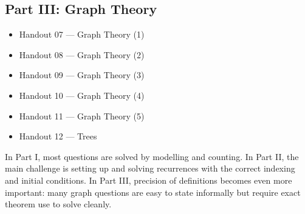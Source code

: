 \documentclass[12pt]{article}
\begin{document}
\subsection*{Part III: Graph Theory}
\begin{itemize}[leftmargin=*]
    \item Handout 07 --- Graph Theory (1)
    \item Handout 08 --- Graph Theory (2)
    \item Handout 09 --- Graph Theory (3)
    \item Handout 10 --- Graph Theory (4)
    \item Handout 11 --- Graph Theory (5)
    \item Handout 12 --- Trees
\end{itemize}

\begin{examtip}[title={What changes across the three parts}]
In Part I, most questions are solved by modelling and counting. In Part II, the main challenge is setting up and solving recurrences with the correct indexing and initial conditions. In Part III, precision of definitions becomes even more important: many graph questions are easy to state informally but require exact theorem use to solve cleanly.
\end{examtip}

\newpage



\newpage

\appendix
{}
\end{document}
